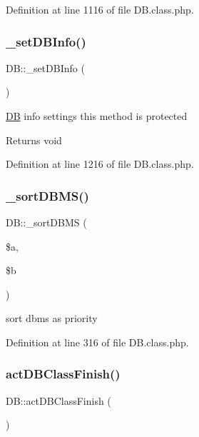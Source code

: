 Definition at line 1116 of file D\+B.\+class.\+php.

\mbox{\label{classDB_a92f2478aeb03b00432332ad4e4a3d700}} 
\subsubsection{\texorpdfstring{\+\_\+set\+D\+B\+Info()}{\_setDBInfo()}}
{\footnotesize\ttfamily D\+B\+::\+\_\+set\+D\+B\+Info (\begin{DoxyParamCaption}{ }\end{DoxyParamCaption})}

\hyperlink{classDB}{DB} info settings this method is protected \begin{DoxyReturn}{Returns}
void 
\end{DoxyReturn}


Definition at line 1216 of file D\+B.\+class.\+php.

\mbox{\label{classDB_ab0a6d97fa16de74b4d991c9a4d633718}} 
\subsubsection{\texorpdfstring{\+\_\+sort\+D\+B\+M\+S()}{\_sortDBMS()}}
{\footnotesize\ttfamily D\+B\+::\+\_\+sort\+D\+B\+MS (\begin{DoxyParamCaption}\item[{}]{\$a,  }\item[{}]{\$b }\end{DoxyParamCaption})}

sort dbms as priority 

Definition at line 316 of file D\+B.\+class.\+php.

\mbox{\label{classDB_abcdbf61ef5e7c96725c7ea2781f165f4}} 
\subsubsection{\texorpdfstring{act\+D\+B\+Class\+Finish()}{actDBClassFinish()}}
{\footnotesize\ttfamily D\+B\+::act\+D\+B\+Class\+Finish (\begin{DoxyParamCaption}{ }\end{DoxyParamCaption})}

